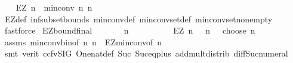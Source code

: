 \begin{isabellebody}
\ \ \isamarkupfalse%
\ {\isachardoublequoteopen}EZ\ n\ {\isasymle}\ min{\isacharunderscore}{\kern0pt}conv\ n\ n{\isachardoublequoteclose}\isanewline
\ \ \ \ \isamarkupfalse%
\ EZ{\isacharunderscore}{\kern0pt}def\ inf{\isacharunderscore}{\kern0pt}subset{\isacharunderscore}{\kern0pt}bounds\ min{\isacharunderscore}{\kern0pt}conv{\isacharunderscore}{\kern0pt}def\ min{\isacharunderscore}{\kern0pt}conv{\isacharunderscore}{\kern0pt}set{\isacharunderscore}{\kern0pt}def\ min{\isacharunderscore}{\kern0pt}conv{\isacharunderscore}{\kern0pt}set{\isacharunderscore}{\kern0pt}non{\isacharunderscore}{\kern0pt}empty\isanewline
\ \ \ \ \isamarkupfalse%
\ fastforce\isanewline
{}\isamarkupfalse%
%
\endisatagproof
{\isafoldproof}%
%
\isadelimproof
\isanewline
%
\endisadelimproof
\isanewline
\isanewline
\isanewline
{}\isamarkupfalse%
\ EZ{\isacharunderscore}{\kern0pt}bound{\isacharunderscore}{\kern0pt}final{\isacharcolon}{\kern0pt}\isanewline
\ \ \ \ \ \ \ {\isachardoublequoteopen}n\ {\isasymge}\ {}{\isachardoublequoteclose}\ \isanewline
\ \ \ \ \ \ \ {\isachardoublequoteopen}EZ\ n\ {\isasymle}\ {\isacharparenleft}{\kern0pt}{\isacharparenleft}{\kern0pt}{\isacharparenleft}{\kern0pt}\ {}{\isacharasterisk}{\kern0pt}n\ {\isacharminus}{\kern0pt}{}\ {\isacharparenright}{\kern0pt}\ choose\ {\isacharparenleft}{\kern0pt}n\ {\isacharminus}{\kern0pt}\ {}{\isacharparenright}{\kern0pt}{\isacharparenright}{\kern0pt}\ {\isacharplus}{\kern0pt}\ {}{\isacharparenright}{\kern0pt}{\isachardoublequoteclose}\isanewline
%
\isadelimproof
\ \ %
\endisadelimproof
%
\isatagproof
{}\isamarkupfalse%
\ assms\ min{\isacharunderscore}{\kern0pt}conv{\isacharunderscore}{\kern0pt}bin{\isacharbrackleft}{\kern0pt}of\ {\isachardoublequoteopen}n{\isacharminus}{\kern0pt}{}{\isachardoublequoteclose}\ {\isachardoublequoteopen}n{\isacharminus}{\kern0pt}{}{\isachardoublequoteclose}{\isacharbrackright}{\kern0pt}\ \ EZ{\isacharunderscore}{\kern0pt}min{\isacharunderscore}{\kern0pt}conv{\isacharbrackleft}{\kern0pt}of\ n{\isacharbrackright}{\kern0pt}\ \isanewline
\ \ \isamarkupfalse%
\ {\isacharparenleft}{\kern0pt}smt\ {\isacharparenleft}{\kern0pt}verit{\isacharcomma}{\kern0pt}\ ccfv{\isacharunderscore}{\kern0pt}SIG{\isacharparenright}{\kern0pt}\ One{\isacharunderscore}{\kern0pt}nat{\isacharunderscore}{\kern0pt}def\ Suc{\isacharunderscore}{\kern0pt}{}\ Suc{\isacharunderscore}{\kern0pt}eq{\isacharunderscore}{\kern0pt}plus{}\ add{\isacharunderscore}{\kern0pt}mult{\isacharunderscore}{\kern0pt}distrib{}\ diff{\isacharunderscore}{\kern0pt}Suc{\isacharunderscore}{\kern0pt}numeral\isanewline

\end{isabellebody}
